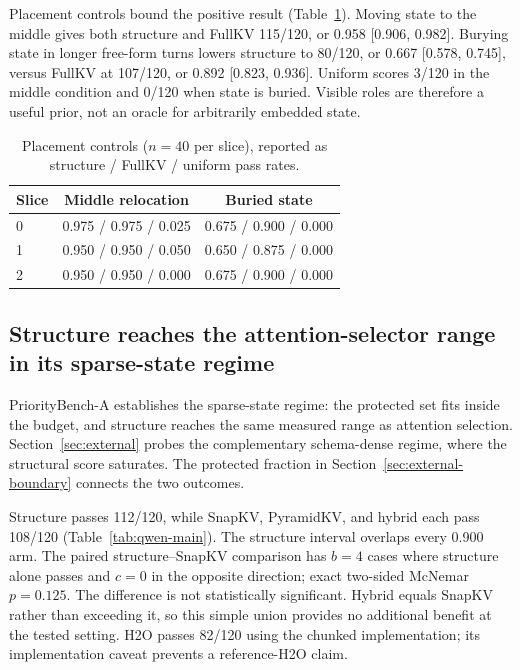 Placement controls bound the positive result (Table~\ref{tab:placement}).
Moving state to the middle gives both structure and FullKV 115/120, or 0.958
[0.906, 0.982].  Burying state in longer free-form turns lowers structure to
80/120, or 0.667 [0.578, 0.745], versus FullKV at 107/120, or 0.892
[0.823, 0.936].  Uniform scores 3/120 in the middle condition and 0/120 when
state is buried.  Visible roles are therefore a useful prior, not an oracle for
arbitrarily embedded state.

\begin{table}[!htbp]
  \centering
  \caption{Placement controls ($n=40$ per slice), reported as structure / FullKV
  / uniform pass rates.}
  \label{tab:placement}
  \begin{tabular}{lcc}
    \toprule
    Slice & Middle relocation & Buried state \\
    \midrule
    0 & 0.975 / 0.975 / 0.025 & 0.675 / 0.900 / 0.000 \\
    1 & 0.950 / 0.950 / 0.050 & 0.650 / 0.875 / 0.000 \\
    2 & 0.950 / 0.950 / 0.000 & 0.675 / 0.900 / 0.000 \\
    \bottomrule
  \end{tabular}
\end{table}

\subsection{Structure reaches the attention-selector range in its sparse-state regime}
\label{sec:p1-results}

PriorityBench-A establishes the sparse-state regime: the protected set fits
inside the budget, and structure reaches the same measured range as attention
selection.  Section~\ref{sec:external} probes the complementary schema-dense
regime, where the structural score saturates.  The protected fraction in
Section~\ref{sec:external-boundary} connects the two outcomes.

Structure passes 112/120, while SnapKV, PyramidKV, and hybrid each pass 108/120
(Table~\ref{tab:qwen-main}).  The structure interval overlaps every 0.900 arm.
The paired structure--SnapKV comparison has $b=4$ cases where
structure alone passes and $c=0$ in the opposite direction; exact two-sided
McNemar $p=0.125$.  The difference is not statistically significant.  Hybrid
equals SnapKV rather than exceeding it, so this simple union provides no
additional benefit at the tested setting.  H2O passes 82/120 using the chunked implementation;
its implementation caveat prevents a reference-H2O claim.

